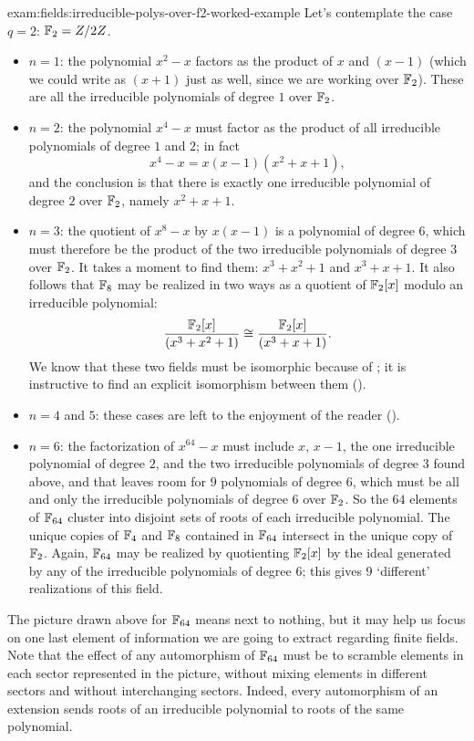 \begin{exam}{}{exam:fields:irreducible-polys-over-f2-worked-example}
  Let's contemplate the case $q = 2$: $\mathbb{F}_2 = Z/2Z$.
  \begin{itemize}
  \item $n = 1$: the polynomial $x^2 - x$ factors as the product of
    $x$ and $(x - 1)$ (which we could write as $(x + 1)$ just as well,
    since we are working over $\mathbb{F}_2$). These are all the irreducible
    polynomials of degree $1$ over $\mathbb{F}_2$.
  \item $n = 2$: the polynomial $x^4 - x$ must factor as the product
    of all irreducible polynomials of degree $1$ and $2$; in fact
    \[
      x^4 - x = x(x-1)(x^2+x+1),
    \]
    and the conclusion is that there is exactly one irreducible
    polynomial of degree $2$ over $\mathbb{F}_2$, namely $x^2 + x + 1$.
  \item $n = 3$: the quotient of $x^8 - x$ by $x(x-1)$ is a polynomial
    of degree $6$, which must therefore be the product of the two
    irreducible polynomials of degree $3$ over $\mathbb{F}_2$. It takes a
    moment to find them: $x^3 + x^2 + 1$ and $x^3 + x + 1$. It also
    follows that $\mathbb{F}_8$ may be realized in two ways as a quotient of
    $\mathbb{F}_2[x]$ modulo an irreducible polynomial:
    \[
      \frac{\mathbb{F}_2[x]}{(x^3+x^2+1)} \cong \frac{\mathbb{F}_2[x]}{(x^3+x+1)}.
    \]
    We know that these two fields must be isomorphic because of
    ; it is instructive to find an explicit
    isomorphism between them
    ().
  \item $n = 4$ and $5$: these cases are left to the enjoyment of the
    reader ().
  \item $n = 6$: the factorization of $x^{64} - x$ must include $x$,
    $x - 1$, the one irreducible polynomial of degree $2$, and the two
    irreducible polynomials of degree $3$ found above, and that leaves
    room for $9$ polynomials of degree $6$, which must be all and only
    the irreducible polynomials of degree $6$ over $\mathbb{F}_2$. So the $64$
    elements of $\mathbb{F}_{64}$ cluster into disjoint sets of roots of each
    irreducible polynomial. The unique copies of $\mathbb{F}_4$ and $\mathbb{F}_8$
    contained in $\mathbb{F}_{64}$ intersect in the unique copy of
    $\mathbb{F}_2$. Again, $\mathbb{F}_{64}$ may be realized by quotienting $\mathbb{F}_2[x]$
    by the ideal generated by any of the irreducible polynomials of
    degree $6$; this gives $9$ `different' realizations of this field.
  \end{itemize}
\end{exam}
The picture drawn above for $\mathbb{F}_{64}$ means next to nothing, but it
may help us focus on one last element of information we are going to
extract regarding finite fields. Note that the effect of any
automorphism of $\mathbb{F}_{64}$ must be to scramble elements in each sector
represented in the picture, without mixing elements in different
sectors and without interchanging sectors. Indeed, every automorphism
of an extension sends roots of an irreducible polynomial to roots of
the same polynomial.

